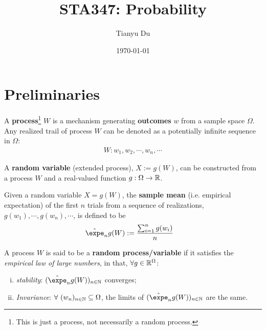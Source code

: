 \documentclass{article}
\title{STA347: Probability}
\date{\today}
\author{Tianyu Du}
\begin{document}
    \maketitle
    \tableofcontents
    \newpage
   	\section{Preliminaries}
   	\begin{definition}
   		A \textbf{process}\footnote{This is just a process, not necessarily a random process.} $W$ is a mechanism generating \textbf{outcomes} $w$ from a sample space $\Omega$. Any realized trail of process $W$ can be denoted as a potentially infinite sequence in $\Omega$:
   		\begin{align}
   			W: w_1, w_2, \cdots, w_n, \cdots
   		\end{align}
   	\end{definition}
   	
   	\begin{definition}
   		A \textbf{random variable} (extended process), $X := g(W)$, can be constructed from a process $W$ and a real-valued function $g: \Omega \to \mathbb{R}$.
   	\end{definition}
   	
   	\begin{definition}
   		Given a random variable $X = g(W)$, the \textbf{sample mean} (i.e. empirical expectation) of the first $n$ trials from a sequence of realizations, $g(w_1), \cdots, g(w_n), \cdots$, is defined to be
   		\begin{align}
   			\hat{\expe}_n g(W) &:= \frac{\sum_{i=1}^n g(w_i)}{n}
   		\end{align}
   	\end{definition}
   	
   	\begin{definition}
   		A process $W$ is said to be a \textbf{random process/variable} if it satisfies the \emph{empirical law of large numbers}, in that, $\forall g \in \mathbb{R}^\Omega$:
   		\begin{enumerate}[(i)]
   			\item \emph{stability}: $(\hat{\expe}_ng(W))_{n\in \N}$ converges;
   			\item \emph{Invariance}: $\forall\ (w_n)_{n \in \mathbb{N}} \subseteq \Omega$, the limits of $(\hat{\expe}_ng(W))_{n\in \N}$ are the same.
   		\end{enumerate}
   	\end{definition}
   	
\end{document}
